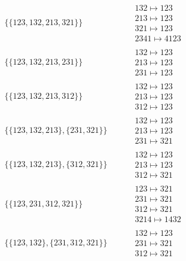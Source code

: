 \begin{tiny}
\begin{align}
\begin{matrix}
\end{matrix}
\\
\{\{123, 132, 213, 321\}\}
\quad
&
\phantom{.}
&
\begin{matrix}
132 \mapsto 123\\213 \mapsto 123\\321 \mapsto 123\\2341 \mapsto 4123
\end{matrix}
\\
\{\{123, 132, 213, 231\}\}
\quad
&
\phantom{.}
&
\begin{matrix}
132 \mapsto 123\\213 \mapsto 123\\231 \mapsto 123
\end{matrix}
\\
\{\{123, 132, 213, 312\}\}
\quad
&
\phantom{.}
&
\begin{matrix}
132 \mapsto 123\\213 \mapsto 123\\312 \mapsto 123
\end{matrix}
\\
\{\{123, 132, 213\}, \{231, 321\}\}
\quad
&
\phantom{.}
&
\begin{matrix}
132 \mapsto 123\\213 \mapsto 123\\231 \mapsto 321
\end{matrix}
\\
\{\{123, 132, 213\}, \{312, 321\}\}
\quad
&
\phantom{.}
&
\begin{matrix}
132 \mapsto 123\\213 \mapsto 123\\312 \mapsto 321
\end{matrix}
\\
\{\{123, 231, 312, 321\}\}
\quad
&
\phantom{.}
&
\begin{matrix}
123 \mapsto 321\\231 \mapsto 321\\312 \mapsto 321\\3214 \mapsto 1432
\end{matrix}
\\
\{\{123, 132\}, \{231, 312, 321\}\}
\quad
&
\phantom{.}
&
\begin{matrix}
132 \mapsto 123\\231 \mapsto 321\\312 \mapsto 321
\end{matrix}
\end{align}
$$
\begin{matrix}

\end{matrix}$$
\end{tiny}
